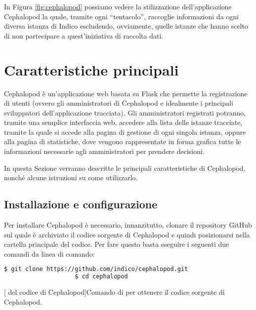 	In Figura \ref{fig:cephalopod} possiamo vedere la stilizzazione dell'applicazione Cephalopod la quale, tramite ogni ``tentacolo'', raccoglie informazioni da ogni diversa istanza di Indico escludendo, ovviamente, quelle istanze che hanno scelto di non partecipare a quest'iniziativa di raccolta dati.
    
    \section{Caratteristiche principali} \label{sec:it;caratteristiche principali}
    
        Cephalopod è un'applicazione web basata su Flask che permette la registrazione di utenti (ovvero gli amministratori di Cephalopod e idealmente i principali sviluppatori dell'applicazione tracciata). Gli amministratori registrati potranno, tramite una semplice interfaccia web, accedere alla lista delle istanze tracciate, tramite la quale si accede alla pagina di gestione di ogni singola istanza, oppure alla pagina di statistiche, dove vengono rappresentate in forma grafica tutte le informazioni necessarie agli amministratori per prendere decisioni.
        
        In questa Sezione verranno descritte le principali caratteristiche di Cephalopod, nonché alcune istruzioni su come utilizzarlo.
        
        \subsection{Installazione e configurazione} \label{subsec:it;cp;installazione_configurazione}
        
            Per installare Cephalopod è necessario, innanzitutto, clonare il repository GitHub sul quale è archiviato il codice sorgente di Cephalopod e quindi posizionarsi nella cartella principale del codice. Per fare questo basta eseguire i seguenti due comandi da linea di comando:
            
            \begin{center}
                \begin{lstlisting}[language=bash, gobble=18]
                    $ git clone https://github.com/indico/cephalopod.git
                    $ cd cephalopod
                \end{lstlisting}
                \captionsetup{textformat=empty,labelformat=empty} \vspace{-2em}
                [ del codice di Cephalopod]{Comando di  per ottenere il codice sorgente di Cephalopod.}
            \end{center}
            
